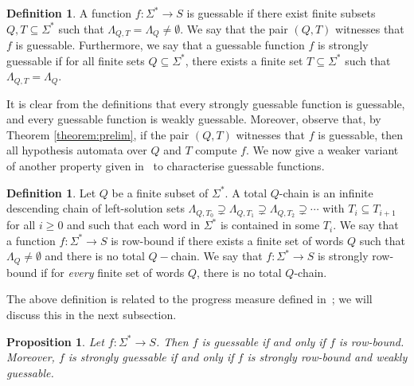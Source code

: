 \documentclass[10pt,a4paper]{amsart}
\newtheorem{prop}[thm]{Proposition}
\theoremstyle{definition}
\newtheorem{defi}[thm]{Definition}
\numberwithin{equation}{section}
\numberwithin{theorem}{section}
\begin{document}
\begin{defi}
A function $f: \Sigma^* \rightarrow S$ is guessable if there exist finite subsets $Q, T \subseteq \Sigma^*$ such that $\Lambda_{Q,T} = \Lambda_{Q} \neq \emptyset$. We say that the pair $(Q,T)$ witnesses that $f$ is guessable. Furthermore, we say that a guessable function $f$ is strongly guessable if for all finite sets $Q \subseteq \Sigma^*$, there exists a finite set $T \subseteq \Sigma^*$ such that $\Lambda_{Q,T} = \Lambda_{Q}$.
\end{defi}

It is clear from the definitions that every strongly guessable function is guessable, and every guessable function is weakly guessable. Moreover, observe that, by Theorem \ref{theorem:prelim}, if the pair $(Q, T)$ witnesses that $f$ is guessable, then all hypothesis automata over $Q$ and $T$ compute $f$.
We now give a weaker variant of another property given in~\cite{HKRS20} to characterise guessable functions.

\begin{defi}
Let $Q$ be a finite subset of $\Sigma^*$.
A total $Q$-chain is an infinite descending chain of left-solution sets $\Lambda_{Q, T_0} \supsetneq \Lambda_{Q, T_1} \supsetneq \Lambda_{Q, T_2} \supsetneq \cdots$  with $T_i \subseteq T_{i+1}$ for all $i \geq 0$ and such that each word in  $\Sigma^*$ is contained in some $T_i$.
We say that a function $f: \Sigma^* \rightarrow S$ is row-bound if there exists a finite set of words $Q$ such that 
$\Lambda_{Q} \neq \emptyset$
 and there is no total $Q-$chain.
We say that $f: \Sigma^* \rightarrow S$ is strongly row-bound if for \emph{every} finite set of words $Q$, there is no total $Q$-chain.
\end{defi}

The above definition is related to the progress measure defined in~\cite[Definition 11]{HKRS20}; we will discuss this in the next subsection.

\begin{prop}
\label{prop:guessable}
Let $f:\Sigma^* \to S$. Then $f$ is guessable if and only if $f$ is row-bound. Moreover, $f$ is strongly guessable if and only if $f$ is strongly row-bound and weakly guessable.
\end{prop}
\end{document}
